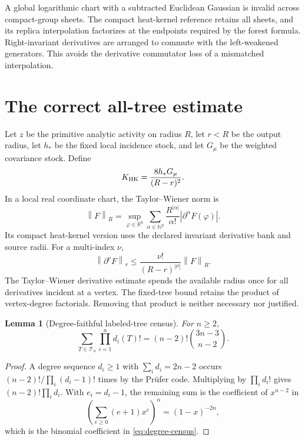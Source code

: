 \documentclass[11pt,oneside,openany]{book}
\newtheorem{lemma}[lemma]{Lemma}
\theoremstyle{definition}
\theoremstyle{remark}
\newcommand{\R}{\mathbb R}
\newcommand{\N}{\mathbb N}
\newcommand{\norm}[1]{\left\lVert#1\right\rVert}
\newcommand{\src}[2]{\cite[#2]{#1}}
\begin{document}
A global logarithmic chart with a subtracted Euclidean Gaussian is invalid across compact-group sheets. The compact heat-kernel reference retains all sheets, and its replica interpolation factorizes at the endpoints required by the forest formula. Right-invariant derivatives are arranged to commute with the left-weakened generators. This avoids the derivative commutator loss of a mismatched interpolation. \src{F9}{V1--V4}

\section{The correct all-tree estimate}
Let $z$ be the primitive analytic activity on radius $R$, let $r<R$ be the output radius, let $h_*$ be the fixed local incidence stock, and let $G_\mu$ be the weighted covariance stock. Define
\begin{equation}\label{eq:KHK}
K_{\rm HK}=\frac{8h_*G_\mu}{(R-r)^2}.
\end{equation}
In a local real coordinate chart, the Taylor--Wiener norm is
\[
\norm{F}_R=\sup_{\varphi\in\R^q}\sum_{\alpha\in\N^q}
\frac{R^{|\alpha|}}{\alpha!}|\partial^\alpha F(\varphi)|.
\]
Its compact heat-kernel version uses the declared invariant derivative bank and source radii. For a multi-index $\nu$,
\[
\norm{\partial^\nu F}_r\le
\frac{\nu!}{(R-r)^{|\nu|}}\norm{F}_R.
\]
The Taylor--Wiener derivative estimate spends the available radius once for all derivatives incident at a vertex. The fixed-tree bound retains the product of vertex-degree factorials. Removing that product is neither necessary nor justified.

\begin{lemma}[Degree-faithful labeled-tree census]\label{lem:degree-census}
For $n\ge2$,
\begin{equation}\label{eq:degree-census}
\sum_{T\in\mathcal T_n}\prod_{i=1}^n d_i(T)!
=(n-2)!\binom{3n-3}{n-2}.
\end{equation}
\end{lemma}
\begin{proof}
A degree sequence $d_i\ge1$ with $\sum_i d_i=2n-2$ occurs $(n-2)!/\prod_i(d_i-1)!$ times by the Pr\"ufer code. Multiplying by $\prod_i d_i!$ gives $(n-2)!\prod_i d_i$. With $e_i=d_i-1$, the remaining sum is the coefficient of $x^{n-2}$ in
\[
\left(\sum_{e\ge0}(e+1)x^e\right)^n=(1-x)^{-2n},
\]
which is the binomial coefficient in \cref{eq:degree-census}.
\end{proof}
\end{document}
